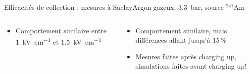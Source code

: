 \begin{frame}{Efficacités de collection : mesures à Saclay}{Argon gazeux, \SI{3.3}{\bar}, source $^{241}$Am}
\begin{scriptsize}
\begin{columns}
\begin{column}{0.5\textwidth}
            \end{column}
        \end{columns}
      		\begin{columns}
            \begin{column}{0.5\textwidth}
                \begin{itemize}
                    \item Comportement similaire entre \SI{1}{\kilo\volt\per\centi\meter} et \SI{1.5}{\kilo\volt\per\centi\meter}
                \end{itemize}
            \end{column}\hfill
            \begin{column}{0.5\textwidth}
                \begin{itemize}
                    \item Comportement similaire, mais différences allant jusqu'à 15\,\%
                    \item[\danger] Mesures faites après charging up, simulations faites avant charging up!
                \end{itemize}
            \end{column}
        \end{columns}
        \end{scriptsize}
    \end{frame}

